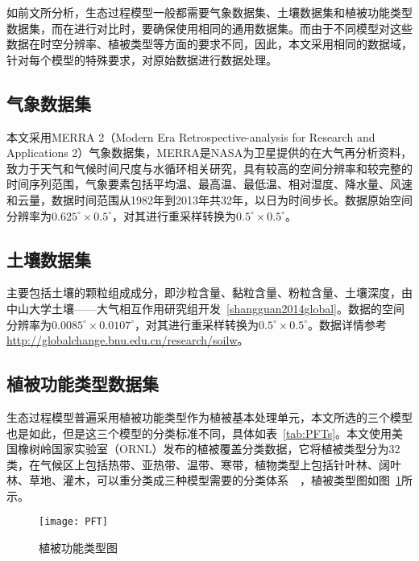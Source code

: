 如前文所分析，生态过程模型一般都需要气象数据集、土壤数据集和植被功能类型数据集，而在进行对比时，要确保使用相同的通用数据集。而由于不同模型对这些数据在时空分辨率、植被类型等方面的要求不同，因此，本文采用相同的数据域，针对每个模型的特殊要求，对原始数据进行数据处理。

\subsection{气象数据集}
本文采用MERRA 2（Modern Era Retrospective-analysis for Research and Applications 2）气象数据集，MERRA是NASA为卫星提供的在大气再分析资料，致力于天气和气候时间尺度与水循环相关研究，具有较高的空间分辨率和较完整的时间序列范围，气象要素包括平均温、最高温、最低温、相对湿度、降水量、风速和云量，数据时间范围从1982年到2013年共32年，以日为时间步长。数据原始空间分辨率为$0.625^{\circ} \times 0.5^{\circ}$，对其进行重采样转换为$0.5^{\circ} \times 0.5^{\circ}$。

\subsection{土壤数据集}
主要包括土壤的颗粒组成成分，即沙粒含量、黏粒含量、粉粒含量、土壤深度，由中山大学土壤——大气相互作用研究组开发~\ref{shangguan2014global}。数据的空间分辨率为$0.0085^{\circ} \times 0.0107^{\circ}$，对其进行重采样转换为$0.5^{\circ} \times 0.5^{\circ}$。数据详情参考\href{http://globalchange.bnu.edu.cn/research/soilw}{http://globalchange.bnu.edu.cn/research/soilw}。

\subsection{植被功能类型数据集}
生态过程模型普遍采用植被功能类型作为植被基本处理单元，本文所选的三个模型也是如此，但是这三个模型的分类标准不同，具体如表~\ref{tab:PFTs}。本文使用美国橡树岭国家实验室（ORNL）发布的植被覆盖分类数据，它将植被类型分为32类，在气候区上包括热带、亚热带、温带、寒带，植物类型上包括针叶林、阔叶林、草地、灌木，可以重分类成三种模型需要的分类体系~\cite{matthews1999global}~\cite{matthews1984prescription}，植被类型图如图~\ref{fig:PFT}所示。

\begin{figure}[!htbp]
    \centering
    \texttt{[image: PFT]}
    \caption{植被功能类型图}
    \label{fig:PFT}
\end{figure}

